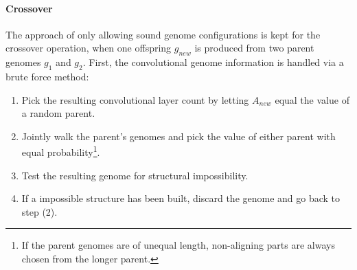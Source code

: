 \documentclass[11pt,a4paper,twoside,openright]{scrbook}
\begin{document}

%
%


\paragraph{Crossover}
The approach of only allowing sound genome configurations is kept for the crossover operation, when one offspring \(g_{new}\) is produced from two parent genomes \(g_{1}\) and \(g_{2}\). First, the convolutional genome information is handled via a brute force method:

\begin{enumerate}
  \item Pick the resulting convolutional layer count by letting \(A_{new}\) equal the value of a random parent.
  \item Jointly walk the parent's genomes and pick the value of either parent with equal probability\footnote{If the parent genomes are of unequal length, non-aligning parts are always chosen from the longer parent.\label{fn:genomelength}}.
  \item Test the resulting genome for structural impossibility.
  \item If a impossible structure has been built, discard the genome and go back to step (2).
\end{enumerate}
\end{document}
